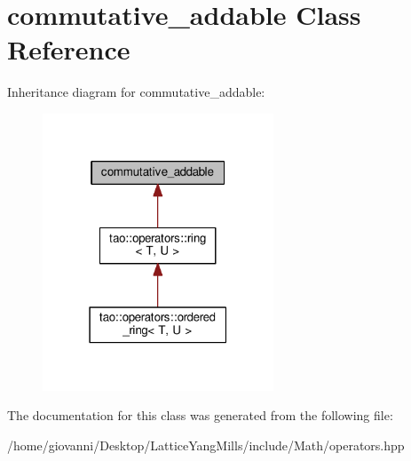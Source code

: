 \hypertarget{classcommutative__addable}{}\section{commutative\+\_\+addable Class Reference}
\label{classcommutative__addable}


Inheritance diagram for commutative\+\_\+addable\+:\nopagebreak
\begin{figure}[H]
\begin{center}
\leavevmode
\includegraphics[width=195pt]{classcommutative__addable__inherit__graph}
\end{center}
\end{figure}


The documentation for this class was generated from the following file\+:\begin{DoxyCompactItemize}
\item 
/home/giovanni/\+Desktop/\+Lattice\+Yang\+Mills/include/\+Math/operators.\+hpp\end{DoxyCompactItemize}
